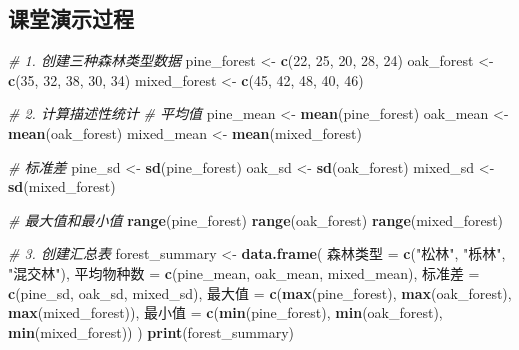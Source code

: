 \documentclass[
]{book}
\newenvironment{Shaded}{\begin{snugshade}}{\end{snugshade}}
\newcommand{\CommentTok}[1]{\textcolor[rgb]{0.56,0.35,0.01}{\textit{#1}}}
\newcommand{\DecValTok}[1]{\textcolor[rgb]{0.00,0.00,0.81}{#1}}
\newcommand{\FunctionTok}[1]{\textcolor[rgb]{0.13,0.29,0.53}{\textbf{#1}}}
\newcommand{\NormalTok}[1]{#1}
\newcommand{\OtherTok}[1]{\textcolor[rgb]{0.56,0.35,0.01}{#1}}
\newcommand{\StringTok}[1]{\textcolor[rgb]{0.31,0.60,0.02}{#1}}
\begin{document}
\hypertarget{ux8bfeux5802ux6f14ux793aux8fc7ux7a0b-6}{%
\subsection{课堂演示过程}\label{ux8bfeux5802ux6f14ux793aux8fc7ux7a0b-6}}

\begin{Shaded}
\begin{Highlighting}[]
\CommentTok{\# 1. 创建三种森林类型数据}
\NormalTok{pine\_forest }\OtherTok{\textless{}{-}} \FunctionTok{c}\NormalTok{(}\DecValTok{22}\NormalTok{, }\DecValTok{25}\NormalTok{, }\DecValTok{20}\NormalTok{, }\DecValTok{28}\NormalTok{, }\DecValTok{24}\NormalTok{)}
\NormalTok{oak\_forest }\OtherTok{\textless{}{-}} \FunctionTok{c}\NormalTok{(}\DecValTok{35}\NormalTok{, }\DecValTok{32}\NormalTok{, }\DecValTok{38}\NormalTok{, }\DecValTok{30}\NormalTok{, }\DecValTok{34}\NormalTok{)  }
\NormalTok{mixed\_forest }\OtherTok{\textless{}{-}} \FunctionTok{c}\NormalTok{(}\DecValTok{45}\NormalTok{, }\DecValTok{42}\NormalTok{, }\DecValTok{48}\NormalTok{, }\DecValTok{40}\NormalTok{, }\DecValTok{46}\NormalTok{)}

\CommentTok{\# 2. 计算描述性统计}
\CommentTok{\# 平均值}
\NormalTok{pine\_mean }\OtherTok{\textless{}{-}} \FunctionTok{mean}\NormalTok{(pine\_forest)}
\NormalTok{oak\_mean }\OtherTok{\textless{}{-}} \FunctionTok{mean}\NormalTok{(oak\_forest)}
\NormalTok{mixed\_mean }\OtherTok{\textless{}{-}} \FunctionTok{mean}\NormalTok{(mixed\_forest)}

\CommentTok{\# 标准差}
\NormalTok{pine\_sd }\OtherTok{\textless{}{-}} \FunctionTok{sd}\NormalTok{(pine\_forest)}
\NormalTok{oak\_sd }\OtherTok{\textless{}{-}} \FunctionTok{sd}\NormalTok{(oak\_forest)}
\NormalTok{mixed\_sd }\OtherTok{\textless{}{-}} \FunctionTok{sd}\NormalTok{(mixed\_forest)}

\CommentTok{\# 最大值和最小值}
\FunctionTok{range}\NormalTok{(pine\_forest)}
\FunctionTok{range}\NormalTok{(oak\_forest)}
\FunctionTok{range}\NormalTok{(mixed\_forest)}

\CommentTok{\# 3. 创建汇总表}
\NormalTok{forest\_summary }\OtherTok{\textless{}{-}} \FunctionTok{data.frame}\NormalTok{(}
\NormalTok{  森林类型 }\OtherTok{=} \FunctionTok{c}\NormalTok{(}\StringTok{"松林"}\NormalTok{, }\StringTok{"栎林"}\NormalTok{, }\StringTok{"混交林"}\NormalTok{),}
\NormalTok{  平均物种数 }\OtherTok{=} \FunctionTok{c}\NormalTok{(pine\_mean, oak\_mean, mixed\_mean),}
\NormalTok{  标准差 }\OtherTok{=} \FunctionTok{c}\NormalTok{(pine\_sd, oak\_sd, mixed\_sd),}
\NormalTok{  最大值 }\OtherTok{=} \FunctionTok{c}\NormalTok{(}\FunctionTok{max}\NormalTok{(pine\_forest), }\FunctionTok{max}\NormalTok{(oak\_forest), }\FunctionTok{max}\NormalTok{(mixed\_forest)),}
\NormalTok{  最小值 }\OtherTok{=} \FunctionTok{c}\NormalTok{(}\FunctionTok{min}\NormalTok{(pine\_forest), }\FunctionTok{min}\NormalTok{(oak\_forest), }\FunctionTok{min}\NormalTok{(mixed\_forest))}
\NormalTok{)}
\FunctionTok{print}\NormalTok{(forest\_summary)}


\end{Highlighting}
\end{Shaded}
\end{document}

